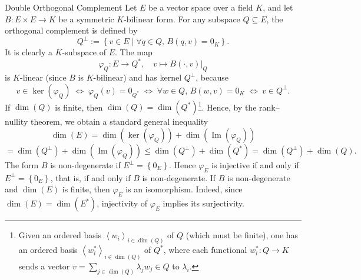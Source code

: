 \begin{appendixitem}{Double Orthogonal Complement}
    Let \( E \) be a vector space over a field \( K \), and let \( B \colon E \times E \to K \) be a symmetric \( K \)-bilinear form. For any subspace \( Q \subseteq E \), the orthogonal complement is defined by
    \[
        Q^{\perp} := \left\{ v \in E \mid \forall q \in Q, \, B\left(q, v\right) = 0_K \right\}.
    \]
    It is clearly a \( K \)-subspace of \( E \). The map
    \[
        \varphi_Q \colon E \to Q^{*}, \quad v \mapsto B\left(\cdot, v\right)\big|_{Q}
    \]
    is \( K \)-linear (since \( B \) is \( K \)-bilinear) and has kernel \( Q^{\perp} \), because
    \[
        v \in \ker\left(\varphi_Q\right) \;\Longleftrightarrow\; \varphi_Q\left(v\right) = 0_{Q^{*}} \;\Longleftrightarrow\; \forall w \in Q, \, B\left(w, v\right) = 0_K \;\Longleftrightarrow\; v \in Q^{\perp}.
    \]
    If \( \dim\left(Q\right) \) is finite, then \( \dim\left(Q\right) = \dim\left(Q^{*}\right) \)\footnote{Given an ordered basis \( \left\langle w_i \right\rangle_{i \in \dim\left(Q\right)} \) of \( Q \) (which must be finite), one has an ordered basis \( \left\langle w_i^{*} \right\rangle_{i \in \dim\left(Q\right)} \) of \( Q^{*} \), where each functional \( w_i^{*} \colon Q \to K \) sends a vector \( v = \sum_{j \in \dim\left(Q\right)} \lambda_j w_j \in Q \) to \( \lambda_i \).}. Hence, by the rank–nullity theorem, we obtain a standard general inequality
    \[
        \dim\left(E\right) = \dim\left(\ker\left(\varphi_Q\right)\right) + \dim\left(\operatorname{Im}\left(\varphi_Q\right)\right)
    \]
    \[
        = \dim\left(Q^{\perp}\right) + \dim\left(\operatorname{Im}\left(\varphi_Q\right)\right) \leq \dim\left(Q^{\perp}\right) + \dim\left(Q^{*}\right) = \dim\left(Q^{\perp}\right) + \dim\left(Q\right).
    \]
    The form \( B \) is non-degenerate if \( E^{\perp} = \left\{ 0_E \right\} \). Hence \( \varphi_E \) is injective if and only if \( E^{\perp} = \left\{ 0_E \right\} \), that is, if and only if \( B \) is non-degenerate. If \( B \) is non-degenerate and \( \dim\left(E\right) \) is finite, then \( \varphi_E \) is an isomorphism. Indeed, since \( \dim\left(E\right) = \dim\left(E^{*}\right) \), injectivity of \( \varphi_E \) implies its surjectivity.

\end{appendixitem}
